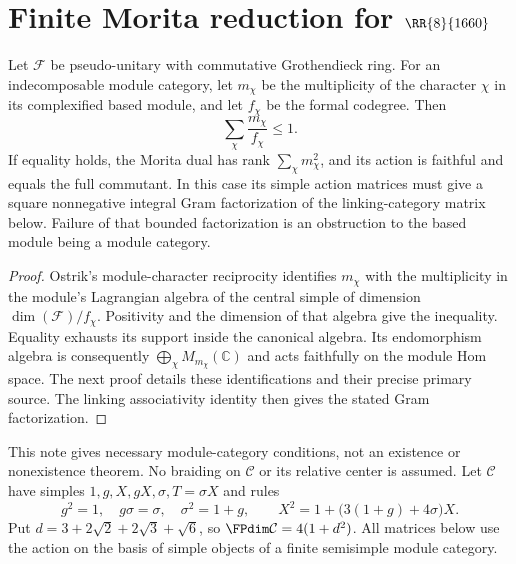 \section{Finite Morita reduction for \texorpdfstring{$\RR{8}{1660}$}{R6\_8\_1660}}\label{sec:1660-morita-reduction}
\begin{proposition}
Let $\mathcal F$ be pseudo-unitary with commutative Grothendieck ring.
For an indecomposable module category, let $m_\chi$ be the multiplicity
of the character $\chi$ in its complexified based module, and let
$f_\chi$ be the formal codegree. Then
\[
 \sum_\chi\frac{m_\chi}{f_\chi}\leq1.
\]
If equality holds, the Morita dual has rank $\sum_\chi m_\chi^2$,
and its action is faithful and equals the full commutant. In this
case its simple action matrices must give a square nonnegative
integral Gram factorization of the linking-category matrix below.
Failure of that bounded factorization is an obstruction to the based
module being a module category.
\end{proposition}
\begin{proof}
Ostrik's module-character reciprocity identifies $m_\chi$ with the
multiplicity in the module's Lagrangian algebra of the central simple
of dimension $\dim(\mathcal F)/f_\chi$. Positivity and the dimension
of that algebra give the inequality. Equality exhausts its support
inside the canonical algebra. Its endomorphism algebra is consequently
$\bigoplus_\chi M_{m_\chi}(\mathbb C)$ and acts faithfully on the
module Hom space. The next proof details these identifications and
their precise primary source. The linking associativity identity then
gives the stated Gram factorization.
\end{proof}

This note gives necessary module-category conditions, not an existence or
nonexistence theorem. No braiding on $\mathcal C$ or its relative center is assumed.
Let $\mathcal C$ have simples $1,g,X,gX,\sigma,T=\sigma X$ and rules
\[
g^2=1,\quad g\sigma=\sigma,\quad\sigma^2=1+g,\qquad
X^2=1+\bigl(3(1+g)+4\sigma\bigr)X.
\]
Put $d=3+2\sqrt2+2\sqrt3+\sqrt6$, so $\FPdim\mathcal C=4(1+d^2)$.
All matrices below use the action on the basis of simple objects of a
finite semisimple module category.

